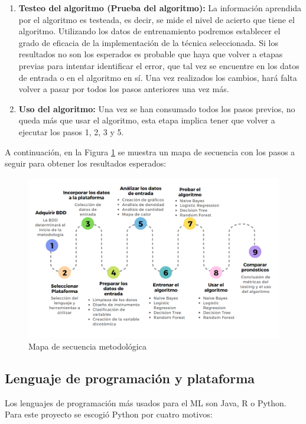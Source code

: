 \begin{enumerate}
	\item \textbf{Testeo del algoritmo (Prueba del algoritmo):} La información aprendida por el algoritmo es testeada, es decir, se mide el nivel de acierto que tiene el algoritmo. Utilizando los datos de entrenamiento podremos establecer el grado de eficacia de la implementación de la técnica seleccionada. Si los resultados no son los esperados es probable que haya que volver a etapas previas para intentar identificar el error, que tal vez se encuentre en los datos de entrada o en el algoritmo en sí. Una vez realizados los cambios, hará falta volver a pasar por todos los pasos anteriores una vez más.
\item \textbf{Uso del algoritmo:} Una vez se han consumado todos los pasos previos, no queda más que usar el algoritmo, esta etapa implica tener que volver a ejecutar los pasos 1, 2, 3 y 5.\\
\end{enumerate}

\par A continuación, en la Figura \ref{fig:mapaDeTiempo} se muestra un mapa de secuencia con los pasos a seguir para obtener los resultados esperados:

\begin{figure}[H]
	\centering
	\includegraphics[scale=0.65]{img/mapaDetiempo.png} 
	\caption{Mapa de secuencia metodológica}
	\label{fig:mapaDeTiempo}
\end{figure}


\doublespacing
\subsection{Lenguaje de programación y plataforma}
Los lenguajes de programación más usados para el ML son Java, R o Python. Para este proyecto se escogió Python por cuatro motivos: 

